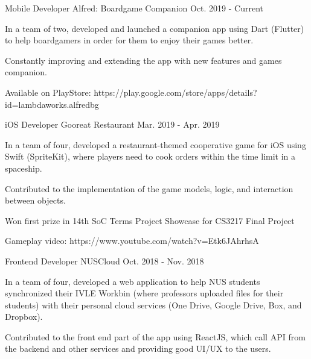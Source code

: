 

\begin{cventries}

  \cventry
    {Mobile Developer} %
    {Alfred: Boardgame Companion} %
    {} %
    {Oct. 2019 - Current} %
    {
      \begin{cvitems} %
        \item {In a team of two, developed and launched a companion app using Dart (Flutter) to help boardgamers in order for them to enjoy their games better.}
        \item {Constantly improving and extending the app with new features and games companion.}
        \item {Available on PlayStore: https://play.google.com/store/apps/details?id=lambdaworks.alfredbg}
      \end{cvitems}
    }
  \cventry
    {iOS Developer} %
    {Gooreat Restaurant} %
    {} %
    {Mar. 2019 - Apr. 2019} %
    {
      \begin{cvitems} %
        \item {In a team of four, developed a restaurant-themed cooperative game for iOS using Swift (SpriteKit), where players need to cook orders within the time limit in a spaceship.}
        \item {Contributed to the implementation of the game models, logic, and interaction between objects.}
        \item {Won first prize in 14th SoC Terms Project Showcase for CS3217 Final Project}
        \item {Gameplay video: https://www.youtube.com/watch?v=Etk6JAhrhsA}
      \end{cvitems}
    }
  \cventry
    {Frontend Developer} %
    {NUSCloud} %
    {} %
    {Oct. 2018 - Nov. 2018} %
    {
      \begin{cvitems} %
        \item {In a team of four, developed a web application to help NUS students synchronized their IVLE Workbin (where professors uploaded files for their students) with their personal cloud services (One Drive, Google Drive, Box, and Dropbox).}
        \item {Contributed to the front end part of the app using ReactJS, which call API from the backend and other services and providing good UI/UX to the users.}
      \end{cvitems}
    }
\end{cventries}
